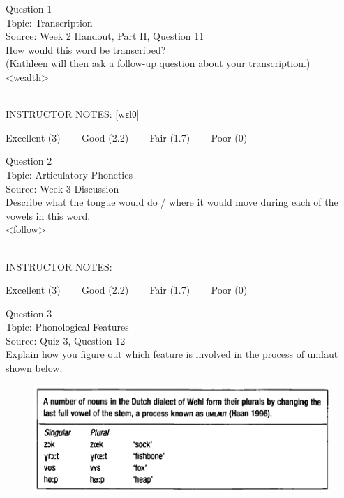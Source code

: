 \documentclass[12pt]{article}
\begin{document}
\begin{center}
\textbf{{\color{blue}{\HUGE START OF EXAM\\}}}

\textbf{{\color{blue}{\HUGE Student ID: 17335\\}}}

\textbf{{\color{blue}{\HUGE \\}}}

\end{center}
\newpage

{\large Question 1}\\

Topic: Transcription\\
Source: Week 2 Handout, Part II, Question 11\\

How would this word be transcribed?\\ (Kathleen will then ask a follow-up question about your transcription.)\\

<wealth>


~\\
INSTRUCTOR NOTES: [wɛlθ]


\vfill
Excellent (3) ~~~ Good (2.2) ~~~ Fair (1.7) ~~~ Poor (0)
\newpage

{\large Question 2}\\

Topic: Articulatory Phonetics\\
Source: Week 3 Discussion\\

Describe what the tongue would do / where it would move during each of the vowels in this word.\\

<follow>


~\\
INSTRUCTOR NOTES: 


\vfill
Excellent (3) ~~~ Good (2.2) ~~~ Fair (1.7) ~~~ Poor (0)
\newpage

{\large Question 3}\\

Topic: Phonological Features\\
Source: Quiz 3, Question 12\\

Explain how you figure out which feature is involved in the process of umlaut shown below.\\

\begin{figure}[H]
\includegraphics{../images/dutch.png}
\end{figure}
\end{document}
